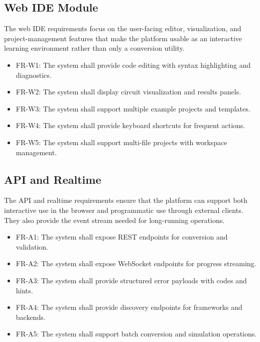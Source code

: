 \subsection{Web IDE Module}
The web IDE requirements focus on the user-facing editor, visualization, and project-management features that make the platform usable as an interactive learning environment rather than only a conversion utility.
\begin{itemize}
    \item FR-W1: The system shall provide code editing with syntax highlighting and diagnostics.
    \item FR-W2: The system shall display circuit visualization and results panels.
    \item FR-W3: The system shall support multiple example projects and templates.
    \item FR-W4: The system shall provide keyboard shortcuts for frequent actions.
    \item FR-W5: The system shall support multi-file projects with workspace management.
\end{itemize}

\subsection{API and Realtime}
The API and realtime requirements ensure that the platform can support both interactive use in the browser and programmatic use through external clients. They also provide the event stream needed for long-running operations.
\begin{itemize}
    \item FR-A1: The system shall expose REST endpoints for conversion and validation.
    \item FR-A2: The system shall expose WebSocket endpoints for progress streaming.
    \item FR-A3: The system shall provide structured error payloads with codes and hints.
    \item FR-A4: The system shall provide discovery endpoints for frameworks and backends.
    \item FR-A5: The system shall support batch conversion and simulation operations.
\end{itemize}

